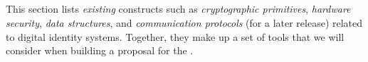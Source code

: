 \subsection{\sfi}
\label{sub:foundations}

This section lists \emph{existing} constructs such as \emph{cryptographic primitives}, \emph{hardware security}, \emph{data structures}, and \emph{communication protocols} (for a later release) related to digital identity systems. Together, they make up a set of tools that we will consider when building a proposal for the \eid.
